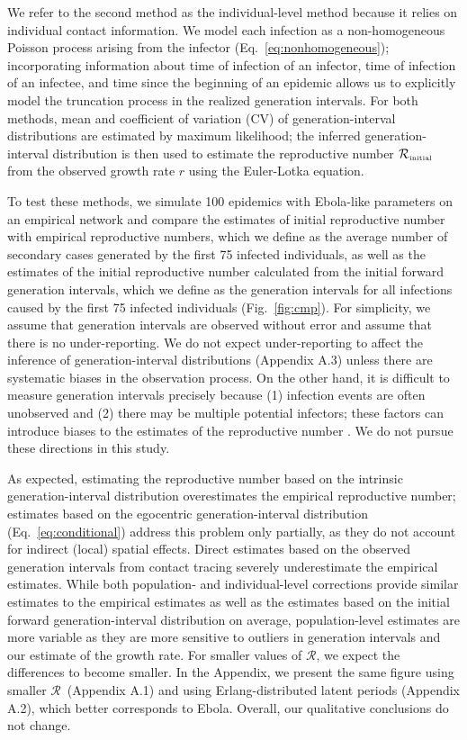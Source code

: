 \documentclass[12pt]{article}
\newcommand{\eref}[1]{Eq.~\ref{eq:#1}}
\newcommand{\fref}[1]{Fig.~\ref{fig:#1}}
\newcommand{\Rx}[1]{\ensuremath{{\mathcal R}_{#1}}\xspace}
\newcommand{\RR}{\ensuremath{{\mathcal R}}}
\newcommand{\Rini}{\Rx{\textrm{\tiny initial}}}
\begin{document}
We refer to the second method as the individual-level method because it relies on individual contact information.
We model each infection as a non-homogeneous Poisson process arising from the infector (\eref{nonhomogeneous}); 
incorporating information about time of infection of an infector, time of infection of an infectee, and time since the beginning of an epidemic allows us to explicitly model the truncation process in the realized generation intervals.
For both methods, mean and coefficient of variation (CV) of generation-interval distributions are estimated by maximum likelihood; the inferred generation-interval distribution is then used to estimate the reproductive number $\Rini$ from the observed growth rate $r$ using the Euler-Lotka equation.

To test these methods, we simulate 100 epidemics with Ebola-like parameters on an empirical network \citep{leskovec2016snap}
and compare the estimates of initial reproductive number with empirical reproductive numbers, which we define as the average number of secondary cases generated by the first 75 infected individuals,
as well as the estimates of the initial reproductive number calculated from the initial forward generation intervals, which we define as the generation intervals for all infections caused by the first 75 infected individuals (\fref{cmp}).
For simplicity, we assume that generation intervals are observed without error and assume that there is no under-reporting.
We do not expect under-reporting to affect the inference of generation-interval distributions (Appendix A.3) unless there are systematic biases in the observation process.
On the other hand, it is difficult to measure generation intervals precisely because (1) infection events are often unobserved and (2) there may be multiple potential infectors; these factors can introduce biases to the estimates of the reproductive number \cite{britton2019estimation}.
We do not pursue these directions in this study.

As expected, estimating the reproductive number based on the intrinsic generation-interval distribution overestimates the empirical reproductive number;
estimates based on the egocentric generation-interval distribution (\eref{conditional}) address this problem only partially, as they do not account for indirect (local) spatial effects. 
Direct estimates based on the observed generation intervals from contact tracing severely underestimate the empirical estimates.
While both population- and individual-level corrections provide similar estimates to the empirical estimates as well as the estimates based on the initial forward generation-interval distribution on average,
population-level estimates are more variable as they are more sensitive to outliers in generation intervals and our estimate of the growth rate.
For smaller values of \RR, we expect the differences to become smaller.
In the Appendix, we present the same figure using smaller \RR\ (Appendix A.1) and using Erlang-distributed latent periods (Appendix A.2), which better corresponds to Ebola.
Overall, our qualitative conclusions do not change.
\end{document}
